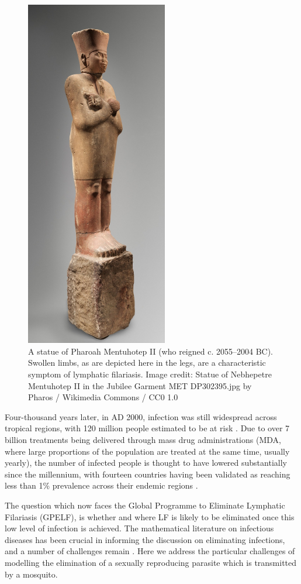 \begin{figure}
    \centering
    \includegraphics[height=15.3cm]{Project/Figures/LFElimination/Mentuhotep.jpg}
    \caption{A statue of Pharoah Mentuhotep  II (who reigned c. 2055--2004 BC). Swollen limbs, as are depicted here in the legs, are a characteristic symptom of lymphatic filariasis. Image credit: Statue of Nebhepetre Mentuhotep II in the Jubilee Garment MET DP302395.jpg by Pharos / Wikimedia Commons / CC0 1.0}
    \label{fig:Pharoh}
\end{figure}

Four-thousand years later, in AD 2000, infection was still widespread across tropical regions, with 120 million people estimated to be at risk \cite{Melrose2004}. Due to over 7 billion treatments being delivered through mass drug administrations (MDA, where large proportions of the population are treated at the same time, usually yearly), the number of infected people is thought to have lowered substantially since the millennium, with fourteen countries having been validated as reaching less than 1\% prevalence across their endemic regions \cite{WHOLF,WHOWER}. 

The question which now faces the Global Programme to Eliminate Lymphatic Filariasis (GPELF), is whether and where LF is likely to be eliminated once this low level of infection is achieved. The mathematical literature on infectious diseases has been crucial in informing the discussion on eliminating infections, and a number of challenges remain \cite{Klepac2015}. Here we address the particular challenges of modelling the elimination of a sexually reproducing parasite which is transmitted by a mosquito.

